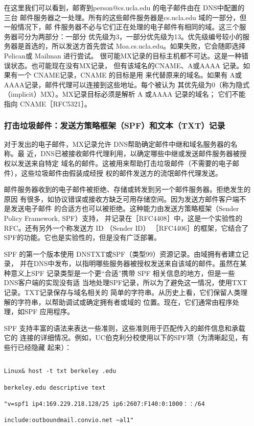 在这里我们可以看到，邮寄到person@cs.ucla.edu 的电子邮件由在 DNS中配置的三台
邮件服务器之一处理。所有的这些邮件服务器是cs.ucla.edu 域的一部分，但一般情况下，邮
件服务器不必与它们正在处理的电子邮件有相同的域。这三个服务器可分为两部分：一部分
优先级为3，一部分优先级为13。优先级编号较小的服务器是首选的，所以发送方首先尝试
Moa.cs.ucla.edu。如果失败，它会随即选择 Pelican或 Mailman 进行尝试。
很可能MX记录的目标主机都不可达。这是一种错误状态。也可能现在没有MX记录，
但有该域名的CNAME、A或AAAA 记录。如果有一个 CNAME记录，CNAME 的目标是用
来代替原来的域名。如果有 A或AAAA记录，邮件代理可以连接到这些地址。每个被认为
其优先级为0（称为隐式 （implicit）MX）。MX记录目标必须是解析 A 或AAAA 记录的域名；
它们不能指向 CNAME［RFC5321］。

\subsubsection{打击垃圾邮件：发送方策略框架（SPF）和文本（TXT）记录}

对于发出的电子邮件，MX记录允许 DNS帮助确定邮件中继和域名服务器的名称。最
近，DNS已被接收邮件代理利用，以确定哪些中继或发送邮件服务器被授权以发送来自特定
域名的邮件。这被用来帮助打击垃圾邮件（不需要的电子邮件），这些垃圾邮件由假装成经授
权的邮件发送方的流氓邮件代理发送。

邮件服务器收到的电子邮件被拒绝、存储或转发到另一个邮件服务器。拒绝发生的原因
有很多，如协议错误或接收方缺乏可用存储空间。因为发送方邮件客户端不是发送电子邮件
的合适方也可以被拒绝。这种能力由发送方策略框架（Sender Policy Framework, SPF）支持，
并记录在［RFC4408］中，这是一个实验性的 RFC。还有另外一个称发送方 ID （Sender ID）
［RFC4406］的框架，它结合了 SPF的功能。它也是实验性的，但是没有广泛部署。

SPF 的第一个版本使用 DNSTXT或SPF（类型99）资源记录。由域拥有者建立记录，
并在DNS中发布，以指明哪些服务器被授权发送来自该域的邮件。虽然在某种意义上SPF
记录类型是一个更“合适”携带 SPF 相关信息的地方，但是一些 DNS客户端的实现没有适
当地处理SPF记录，所以为了避免这一情况，使用TXT记录。TXT记录保存与域名相关的
简单的字符串。从历史上看，它们保留人类理解的字符串，以帮助调试或确定拥有者或域的
位置。现在，它们通常由程序处理，如SPF 应用程序。

SPF 支持丰富的语法来表达一些准则，这些准则用于匹配传入的邮件信息和承载它的
连接的详细情况。例如，UC伯克利分校使用以下的SPF项（为清晰起见，有些行已经隐藏
起来）：

\begin{verbatim}
    
Linux& host -t txt berkeley .edu

berkeley.edu descriptive text

"v=spf1 ip4:169.229.218.128/25 ip6:2607:F140:0:1000：：/64

include:outboundmail.convio.net ~al1"
\end{verbatim}

